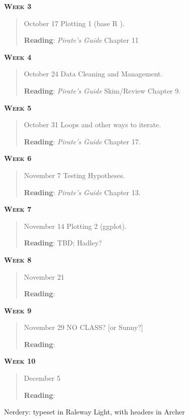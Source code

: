 \documentclass[11pt,letterpaper]{article}
\newcommand{\R}[0]{\textsf{R }}
\begin{document}
\textbf{\textsc{Week 3}}
		\begin{quote}	
		October 17  \textbullet \space Plotting 1 (base \R). 
		
		\textbf{Reading}: \textit{Pirate's Guide} Chapter 11
		\end{quote}

\textbf{\textsc{Week 4}}
		\begin{quote}	
		October 24  \textbullet \space Data Cleaning and Management. 
		
		\textbf{Reading}: \textit{Pirate's Guide} Skim/Review Chapter 9.
		\end{quote}


\textbf{\textsc{Week 5}}
		\begin{quote}	
		October 31  \textbullet \space Loops and other ways to iterate. 
		
		\textbf{Reading}: \textit{Pirate's Guide} Chapter 17.
		\end{quote}

\textbf{\textsc{Week 6}}
		\begin{quote}	
		November 7  \textbullet \space Testing Hypotheses. 
		
		\textbf{Reading}: \textit{Pirate's Guide} Chapter 13.
		\end{quote}


\textbf{\textsc{Week 7}}
		\begin{quote}	
		November 14  \textbullet \space Plotting 2 (ggplot). 
		
		\textbf{Reading}: TBD; Hadley?
		\end{quote}

\textbf{\textsc{Week 8}}
		\begin{quote}	
		November 21  \textbullet \space 
		
		\textbf{Reading}: 
		\end{quote}

\textbf{\textsc{Week 9}}
		\begin{quote}	
		November 29  \textbullet \space NO CLASS? [or Sunny?]
		
		\textbf{Reading}: 
		\end{quote}

\textbf{\textsc{Week 10}}
		\begin{quote}	
		December  5 \textbullet \space 
		
		\textbf{Reading}: 
		\end{quote}




\vfill
{\tiny Nerdery: typeset in Raleway Light, with headers in Archer}
\end{document}
